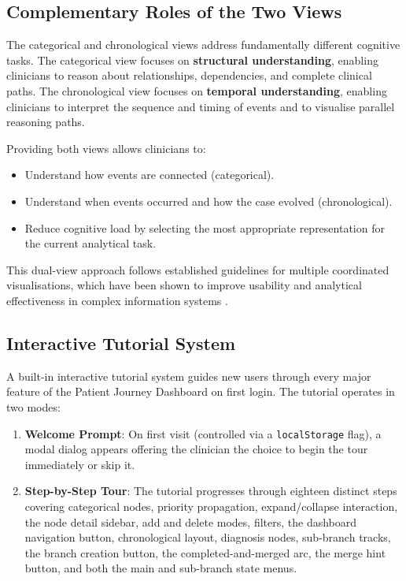 \subsection{Complementary Roles of the Two Views}

The categorical and chronological views address fundamentally different
cognitive tasks. The categorical view focuses on \textbf{structural
understanding}, enabling clinicians to reason about relationships,
dependencies, and complete clinical paths. The chronological view focuses on
\textbf{temporal understanding}, enabling clinicians to interpret the sequence
and timing of events and to visualise parallel reasoning paths.

Providing both views allows clinicians to:
\begin{itemize}
    \item Understand how events are connected (categorical).
    \item Understand when events occurred and how the case evolved (chronological).
    \item Reduce cognitive load by selecting the most appropriate representation
          for the current analytical task.
\end{itemize}

This dual-view approach follows established guidelines for multiple coordinated
visualisations, which have been shown to improve usability and analytical
effectiveness in complex information systems \cite{hospitalDashboards2022}.

\subsection{Interactive Tutorial System}

A built-in interactive tutorial system guides new users through every major
feature of the Patient Journey Dashboard on first login. The tutorial operates
in two modes:

\begin{enumerate}
    \item \textbf{Welcome Prompt}: On first visit (controlled via a
          \texttt{localStorage} flag), a modal dialog appears offering the
          clinician the choice to begin the tour immediately or skip it.
    \item \textbf{Step-by-Step Tour}: The tutorial progresses through eighteen
          distinct steps covering categorical nodes, priority propagation,
          expand/collapse interaction, the node detail sidebar, add and delete
          modes, filters, the dashboard navigation button, chronological layout,
          diagnosis nodes, sub-branch tracks, the branch creation button, the
          completed-and-merged arc, the merge hint button, and both the main
          and sub-branch state menus.
\end{enumerate}


